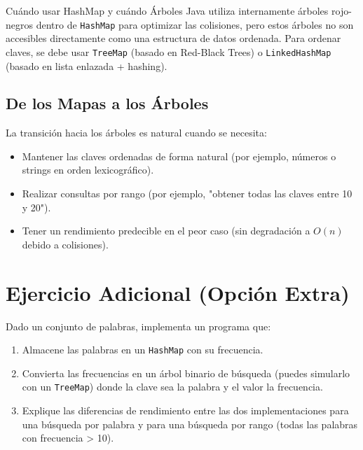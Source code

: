\begin{observacion}{Cuándo usar HashMap y cuándo Árboles}
Java utiliza internamente árboles rojo-negros dentro de \texttt{HashMap} para optimizar las colisiones, pero estos árboles no son accesibles directamente como una estructura de datos ordenada. Para ordenar claves, se debe usar \texttt{TreeMap} (basado en Red-Black Trees) o \texttt{LinkedHashMap} (basado en lista enlazada + hashing).
\end{observacion}

\subsection{De los Mapas a los Árboles}

La transición hacia los árboles es natural cuando se necesita:
\begin{itemize}
    \item Mantener las claves ordenadas de forma natural (por ejemplo, números o strings en orden lexicográfico).
    \item Realizar consultas por rango (por ejemplo, "obtener todas las claves entre 10 y 20").
    \item Tener un rendimiento predecible en el peor caso (sin degradación a \(O(n)\) debido a colisiones).
\end{itemize}

\section{Ejercicio Adicional (Opción Extra)}
\label{sec:ejercicio-extra}

\begin{ejercicio}
Dado un conjunto de palabras, implementa un programa que:
\begin{enumerate}
    \item Almacene las palabras en un \texttt{HashMap} con su frecuencia.
    \item Convierta las frecuencias en un árbol binario de búsqueda (puedes simularlo con un \texttt{TreeMap}) donde la clave sea la palabra y el valor la frecuencia.
    \item Explique las diferencias de rendimiento entre las dos implementaciones para una búsqueda por palabra y para una búsqueda por rango (todas las palabras con frecuencia > 10).
\end{enumerate}
\end{ejercicio}



\printbibliography[heading=subbibliography]